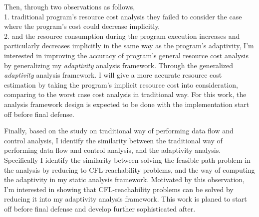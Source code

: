 Then, through two observations as follows,
\\
1. traditional program's resource cost analysis they failed to consider the case where the program's cost could decrease 
 implicitly, 
 \\
 2. and 
 the resource consumption during the program 
 execution increases and particularly decreases implicitly in the same way as the program's adaptivity, 
 I'm interested in improving the accuracy of program's general resource cost analysis
 by generalizing my \emph{adaptivity} analysis framework.
 Through the generalized \emph{adaptivity} analysis framework.
 I will give
 a more accurate resource cost estimation by taking the program's implicit resource cost into consideration, comparing 
 to the worst case cost analysis in traditional way.
 For this work, the analysis framework design is expected to be done with the implementation start off before final defense.


 Finally, based on the study on traditional way of performing data flow and control analysis,
 I identify the similarity between the traditional way of performing data flow and control analysis, and the 
 adaptivity analysis.  
 Specifically I identify the similarity between 
 solving the feasible path problem in the analysis by reducing to CFL-reachability problems,
 and the way of computing the adaptivity in my static analysis framework.
 Motivated by this observation, 
 I'm interested in showing that
 CFL-reachability problems can be solved by reducing it into my adaptivity analysis framework. 
 This work is planed to start off before final defense and develop further sophisticated after.
